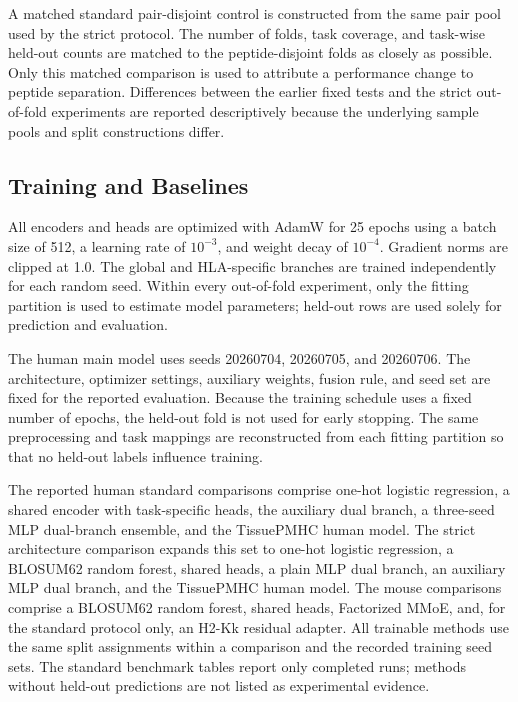 A matched standard pair-disjoint control is constructed from the same pair pool used by the strict protocol. The number of folds, task coverage, and task-wise held-out counts are matched to the peptide-disjoint folds as closely as possible. Only this matched comparison is used to attribute a performance change to peptide separation. Differences between the earlier fixed tests and the strict out-of-fold experiments are reported descriptively because the underlying sample pools and split constructions differ.

\subsection{Training and Baselines}

All encoders and heads are optimized with AdamW \cite{loshchilov2019adamw} for 25 epochs using a batch size of 512, a learning rate of \(10^{-3}\), and weight decay of \(10^{-4}\). Gradient norms are clipped at 1.0. The global and HLA-specific branches are trained independently for each random seed. Within every out-of-fold experiment, only the fitting partition is used to estimate model parameters; held-out rows are used solely for prediction and evaluation.

The human main model uses seeds 20260704, 20260705, and 20260706. The architecture, optimizer settings, auxiliary weights, fusion rule, and seed set are fixed for the reported evaluation. Because the training schedule uses a fixed number of epochs, the held-out fold is not used for early stopping. The same preprocessing and task mappings are reconstructed from each fitting partition so that no held-out labels influence training.

The reported human standard comparisons comprise one-hot logistic regression, a shared encoder with task-specific heads, the auxiliary dual branch, a three-seed MLP dual-branch ensemble, and the TissuePMHC human model. The strict architecture comparison expands this set to one-hot logistic regression, a BLOSUM62 random forest, shared heads, a plain MLP dual branch, an auxiliary MLP dual branch, and the TissuePMHC human model. The mouse comparisons comprise a BLOSUM62 random forest, shared heads, Factorized MMoE, and, for the standard protocol only, an H2-Kk residual adapter. All trainable methods use the same split assignments within a comparison and the recorded training seed sets. The standard benchmark tables report only completed runs; methods without held-out predictions are not listed as experimental evidence.

